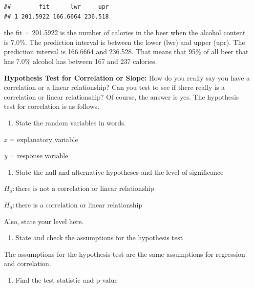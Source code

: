 \documentclass[]{book}
\providecommand{\tightlist}{%
  \setlength{\itemsep}{0pt}\setlength{\parskip}{0pt}}
\begin{document}
\begin{verbatim}
##        fit      lwr     upr
## 1 201.5922 166.6664 236.518
\end{verbatim}

the fit = 201.5922 is the number of calories in the beer when the alcohol content is 7.0\%. The prediction interval is between the lower (lwr) and upper (upr). The prediction interval is 166.6664 and 236.528. That means that 95\% of all beer that has 7.0\% alcohol has between 167 and 237 calories.

\textbf{Hypothesis Test for Correlation or Slope:}
How do you really say you have a correlation or a linear relationship? Can you test to see if there really is a correlation or linear relationship? Of course, the answer is yes. The hypothesis test for correlation is as follows.

\begin{enumerate}
\def\labelenumi{\arabic{enumi}.}
\tightlist
\item
  State the random variables in words.
\end{enumerate}

\emph{x} = explanatory variable

\emph{y} = response variable

\begin{enumerate}
\def\labelenumi{\arabic{enumi}.}
\setcounter{enumi}{1}
\tightlist
\item
  State the null and alternative hypotheses and the level of significance
\end{enumerate}

\(H_o: \text{there is not a correlation or linear relationship}\)

\(H_a: \text{there is a correlation or linear relationship}\)

Also, state your level here.

\begin{enumerate}
\def\labelenumi{\arabic{enumi}.}
\setcounter{enumi}{2}
\tightlist
\item
  State and check the assumptions for the hypothesis test
\end{enumerate}

The assumptions for the hypothesis test are the same assumptions for regression and correlation.

\begin{enumerate}
\def\labelenumi{\arabic{enumi}.}
\setcounter{enumi}{3}
\tightlist
\item
  Find the test statistic and p-value
\end{enumerate}
\end{document}
